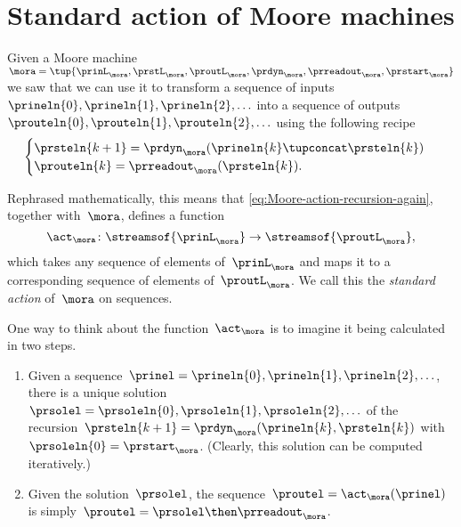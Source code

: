 
\section{Standard action of Moore machines}
\label{sec:Moore-acting-on-sequences}

Given a Moore machine~$\mora = \tup{\prinL_\mora,\prstL_\mora,\proutL_\mora,\prdyn_\mora,\prreadout_\mora,\prstart_\mora}$
we saw that we can use it to transform a sequence of inputs~$\prineln{0}, \prineln{1}, \prineln{2}, \ldots$ into a sequence of outputs~$\prouteln{0}, \prouteln{1}, \prouteln{2}, \ldots$ using the following recipe
\begin{equation}
    \label{eq:Moore-action-recursion-again}
    \begin{cases}
        \prsteln{k+1} = \prdyn_\mora(\prineln{k} \tupconcat \prsteln{k}) \\
        \prouteln{k}   = \prreadout_\mora(\prsteln{k}).
    \end{cases}
\end{equation}

Rephrased mathematically, this means that \cref{eq:Moore-action-recursion-again}, together with~$\mora$, defines a function
\begin{equation}
    \act_{\mora} \colon \streamsof{\prinL_\mora}  \to \streamsof{\proutL_\mora},
\end{equation}
which takes any sequence of elements of~$\prinL_\mora$ and maps it to a corresponding sequence of elements of~$\proutL_\mora$.
We call this the \emph{standard action} of~$\mora$ on sequences.

\begin{remark}
    \label{re:moore-action-two-steps}
    One way to think about the function~$\act_{\mora}$ is to imagine it being calculated in two steps.
    \begin{enumerate}
        \item Given a sequence~$\prinel = \prineln{0}, \prineln{1}, \prineln{2}, \ldots$, there is a unique solution~$\prsolel = \prsoleln{0}, \prsoleln{1}, \prsoleln{2}, \ldots$ of the recursion~$\prsteln{k+1} = \prdyn_\mora(\prineln{k}, \prsteln{k})$ with~$\prsoleln{0} = \prstart_\mora$.
              (Clearly, this solution can be computed iteratively.)
        \item Given the solution~$\prsolel$, the sequence~$\proutel = \act_{\mora}(\prinel)$ is simply~$\proutel = \prsolel \then \prreadout_\mora$.
    \end{enumerate}
\end{remark}

